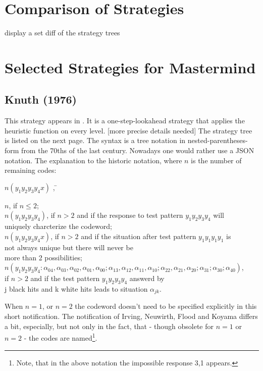\section{Comparison of Strategies}

display a set diff of the strategy trees

\section{Selected Strategies for Mastermind}

\subsection{Knuth (1976)}

This strategy appears in \cite{KNUTH76}. It is a one-step-lookahead strategy that applies the \minmax heuristic function on every level. [more precise details needed] The strategy tree is listed on the next page. The syntax is a tree notation in nested-parentheses-form from the 70ths of the last century. Nowadays one would rather use a JSON notation. The explanation to the historic notation, where $n$ is the number of remaining codes:

\begin{tabbing}
$n(y_{1} y_{2} y_{3} y_{4} x)$ , \= \kill

$n$, \> if $n \leq 2$; \\
$n(y_{1} y_{2} y_{3} y_{4})$, \> if $n>2$ and if the response to test pattern $y_{1} y_{2} y_{3} y_{4}$ will \\
\> uniquely charcterize the codeword;\\
$n(y_{1} y_{2} y_{3} y_{4} x)$, \> if $n>2$ and if the situation after test pattern $y_{1} y_{1} y_{1} y_{1}$ is \\
\> not always unique but there will never be\\
\> more than 2 possibilities;\\
$n(y_{1} y_{2} y_{3} y_{4}: \alpha_{04},\alpha_{03},\alpha_{02},\alpha_{01},\alpha_{00};\alpha_{13},\alpha_{12},\alpha_{11},\alpha_{10};\alpha_{22},\alpha_{21},\alpha_{20};\alpha_{31};\alpha_{30};\alpha_{40})$, \\
\> if $n>2$ and if the test pattern $y_{1} y_{2} y_{3} y_{4}$ answerd by \\
\> j black hits and k white hits leads to situation $\alpha_{jk}.$  \\
\end{tabbing}

When $n = 1$, or $n = 2$ the codeword doesn't need to be specified explicitly in this short notification. The notification of Irving, Neuwirth, Flood and Koyama differs a bit, especially, but not only in the fact, that - though obsolete for $n=1$ or $n=2$ - the codes are named\footnote{Note, that in
the above notation the impossible response 3,1 appears.}. 

